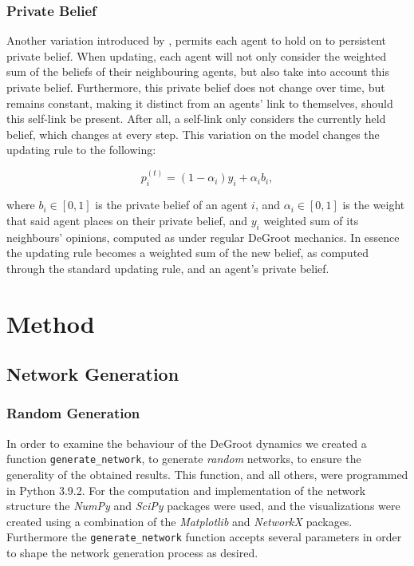 \documentclass[a4paper, 12pt]{report}
\newcommand{\beli}[3][2]{p_{#2}^{(#3)}}
\begin{document}
\subsection{Private Belief}

Another variation introduced by \parencite{friedkin1990private}, permits each agent to hold on to persistent private belief. When updating, each agent will not only consider the weighted sum of the beliefs of their neighbouring agents, but also take into account this private belief. Furthermore, this private belief does not change over time, but remains constant, making it distinct from an agents' link to themselves, should this self-link be present. After all, a self-link only considers the currently held belief, which changes at every step. This variation on the model changes the updating rule to the following:

\begin{equation*}
    \beli{i}{t} = (1-\alpha_i)y_i + \alpha_i b_i,
\end{equation*}

\noindent where $b_i \in [0, 1]$ is the private belief of an agent $i$, and $\alpha_i \in [0, 1]$ is the weight that said agent places on their private belief, and $y_i$ weighted sum of its neighbours' opinions, computed as under regular DeGroot mechanics. In essence the updating rule becomes a weighted sum of the new belief, as computed through the standard updating rule, and an agent's private belief.
 
\newpage
\chapter{Method}
\section{Network Generation}

\subsection{Random Generation}
\label{generation:random}

In order to examine the behaviour of the DeGroot dynamics we created a function \texttt{generate\_network}, to generate \emph{random} networks, to ensure the generality of the obtained results. This function, and all others, were programmed in Python 3.9.2. For the computation and implementation of the network structure the \emph{NumPy} \parencite{2020NumPy-Array} and \emph{SciPy} \parencite{2020SciPy-NMeth} packages were used, and the visualizations were created using a combination of the \emph{Matplotlib} \parencite{matplotlib} and \emph{NetworkX} \parencite{networkx} packages. Furthermore the \texttt{generate\_network} function accepts several parameters in order to shape the network generation process as desired.
\end{document}
